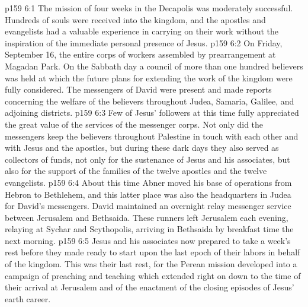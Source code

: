 \vs p159 6:1 The mission of four weeks in the Decapolis was moderately successful. Hundreds of souls were received into the kingdom, and the apostles and evangelists had a valuable experience in carrying on their work without the inspiration of the immediate personal presence of Jesus.
\vs p159 6:2 On Friday, September 16, the entire corps of workers assembled by prearrangement at Magadan Park. On the Sabbath day a council of more than one hundred believers was held at which the future plans for extending the work of the kingdom were fully considered. The messengers of David were present and made reports concerning the welfare of the believers throughout Judea, Samaria, Galilee, and adjoining districts.
\vs p159 6:3 Few of Jesus’ followers at this time fully appreciated the great value of the services of the messenger corps. Not only did the messengers keep the believers throughout Palestine in touch with each other and with Jesus and the apostles, but during these dark days they also served as collectors of funds, not only for the sustenance of Jesus and his associates, but also for the support of the families of the twelve apostles and the twelve evangelists.
\vs p159 6:4 About this time Abner moved his base of operations from Hebron to Bethlehem, and this latter place was also the headquarters in Judea for David’s messengers. David maintained an overnight relay messenger service between Jerusalem and Bethsaida. These runners left Jerusalem each evening, relaying at Sychar and Scythopolis, arriving in Bethsaida by breakfast time the next morning.
\vs p159 6:5 Jesus and his associates now prepared to take a week’s rest before they made ready to start upon the last epoch of their labors in behalf of the kingdom. This was their last rest, for the Perean mission developed into a campaign of preaching and teaching which extended right on down to the time of their arrival at Jerusalem and of the enactment of the closing episodes of Jesus’ earth career.
